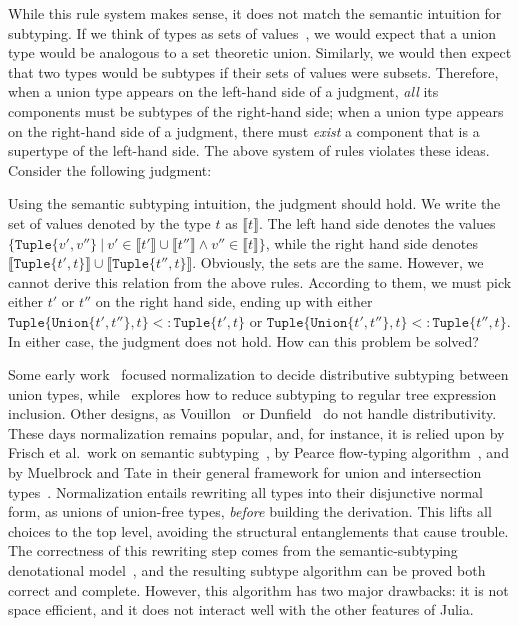 \documentclass[a4paper,english]{lipics-v2019}
\newcommand{\xt}[1]{\texttt{#1}}
\newcommand{\union}[2]{\xt{Union\{}#1,#2\xt{\}}}
\newcommand{\sub}{<:}
\newcommand{\tuple}[1]{\xt{Tuple\{}#1\xt{\}}}
\begin{document}
\noindent While this rule system makes sense, it does not match the
semantic intuition for subtyping. If we think of types as sets of
values~\cite{Pierce1991}, we would expect that a union type would be
analogous to a set theoretic union. Similarly, we would then expect that two
types would be subtypes if their sets of values were subsets.  Therefore,
when a union type appears on the left-hand side of a judgment, \emph{all}
its components must be subtypes of the right-hand side; when a union type
appears on the right-hand side of a judgment, there must \emph{exist} a
component that is a supertype of the left-hand side. The above
system of rules violates these ideas. Consider the following judgment:

%
\vspace{-5.5mm}{\small\[
\tuple{\union{t'}{t''}, t} \ \ \sub\ \ \union{\tuple{t', t}}{\tuple{t'', t}} 
\]}
\vspace{-6mm}
%

\noindent Using the semantic subtyping intuition, the judgment should hold. We write the
set of values denoted by the type $t$ as {\small $\llbracket t \rrbracket$}.
The left hand side denotes the values {\small $\{\tuple{v',v''} ~|~ v' \in
  \llbracket t' \rrbracket \cup \llbracket t'' \rrbracket \wedge v'' \in
  \llbracket t \rrbracket\}$}, while the right hand side denotes {\small
  $\llbracket \tuple{t', t} \rrbracket \cup \llbracket \tuple{t'', t}
  \rrbracket$}.  Obviously, the sets are the same. However, we cannot derive
this relation from the above rules. According to them, we must pick either
{\small $t'$} or {\small $t''$} on the right hand side, ending up with either {\small
  $\tuple{\union{t'}{t''}, t} \sub \tuple{t', t}$} or {\small
  $\tuple{\union{t'}{t''}, t} \sub \tuple{t'', t}$}. In either case, the
judgment does not hold. How can this problem be solved?

Some early work~\cite{barbanera1991intersection,Pierce1991,aiken1991implementing} focused
normalization to decide distributive subtyping between union types,
while~\cite{DBLP:conf/tacs/Damm94} explores how to reduce subtyping to regular tree
expression inclusion.
Other designs, as Vouillon~\cite{Vouillon04} or Dunfield~\cite{DBLP:journals/jfp/Dunfield14} do not handle distributivity. These days normalization remains popular, and, for instance, it is
relied upon by Frisch et al.\ work on semantic subtyping~\cite{Frisch08}, by Pearce
flow-typing algorithm~\cite{DBLP:conf/vmcai/Pearce13}, and by
Muelbrock and Tate in their general framework for union and intersection
types~\cite{muehlboeck2018empowering}. Normalization
entails rewriting all types into their disjunctive normal form, as unions of
union-free types, \emph{before} building the derivation. This lifts all
choices to the top level, avoiding the structural entanglements that cause
trouble. The correctness of this rewriting step comes from the
semantic-subtyping denotational model~\cite{Frisch08}, and the resulting
subtype algorithm can be proved both correct and complete. However, this
algorithm has two major drawbacks: it is not space efficient, and it does not
interact well with the other features of Julia.
\nopagebreak
\end{document}
